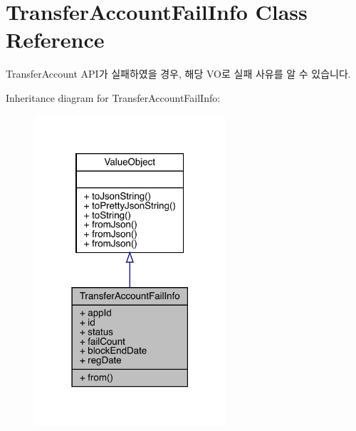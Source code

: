 \hypertarget{classcom_1_1toast_1_1android_1_1gamebase_1_1auth_1_1transfer_1_1data_1_1_transfer_account_fail_info}{}\section{Transfer\+Account\+Fail\+Info Class Reference}
\label{classcom_1_1toast_1_1android_1_1gamebase_1_1auth_1_1transfer_1_1data_1_1_transfer_account_fail_info}


Transfer\+Account A\+P\+I가 실패하였을 경우, 해당 V\+O로 실패 사유를 알 수 있습니다.  




Inheritance diagram for Transfer\+Account\+Fail\+Info\+:
\nopagebreak
\begin{figure}[H]
\begin{center}
\leavevmode
\includegraphics[width=202pt]{classcom_1_1toast_1_1android_1_1gamebase_1_1auth_1_1transfer_1_1data_1_1_transfer_account_fail_info__inherit__graph}
\end{center}
\end{figure}


